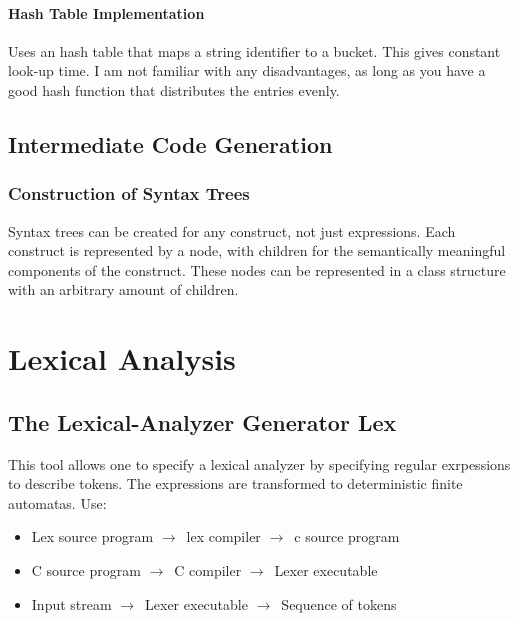 \documentclass{article}
\newcommand{\ta}{$\to$~}
\begin{document}
\paragraph{Hash Table Implementation}
Uses an hash table that maps a string identifier to a bucket. This gives constant look-up time. I am not familiar with any disadvantages, as long as you have a good hash function that distributes the entries evenly.




\subsection{Intermediate Code Generation} %
\label{sub:Intermediate Code Generation}

\subsubsection{Construction of Syntax Trees} %
\label{ssub:Construction of Syntax Trees}
Syntax trees can be created for any construct, not just expressions. Each construct is represented by a node, with children for the semantically meaningful components of the construct. These nodes can be represented in a class structure with an arbitrary amount of children.



\section{Lexical Analysis} %
\label{sec:Lexical Analysis}

\subsection{The Lexical-Analyzer Generator Lex} %
\label{sub:The Lexical-Analyzer Generator Lex}
This tool allows one to specify a lexical analyzer by specifying regular exrpessions to describe tokens. The expressions are transformed to deterministic finite automatas. Use:
\begin{itemize}
	\item Lex source program \ta lex compiler \ta c source program
	\item C source program \ta C compiler \ta Lexer executable
	\item Input stream \ta Lexer executable \ta Sequence of tokens
\end{itemize}
\end{document}

